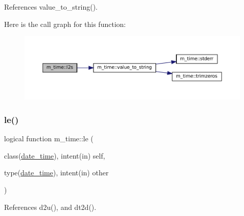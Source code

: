 References value\+\_\+to\+\_\+string().

Here is the call graph for this function\+:\nopagebreak
\begin{figure}[H]
\begin{center}
\leavevmode
\includegraphics[width=350pt]{namespacem__time_a03e90459e69ffa353d1a6ce5765836fd_cgraph}
\end{center}
\end{figure}
\mbox{\label{namespacem__time_a498bb2830d153743d9624e65e92d4f6c}} 
\subsubsection{\texorpdfstring{le()}{le()}}
{\footnotesize\ttfamily logical function m\+\_\+time\+::le (\begin{DoxyParamCaption}\item[{class(\mbox{\hyperlink{structm__time_1_1date__time}{date\+\_\+time}}), intent(in)}]{self,  }\item[{type(\mbox{\hyperlink{structm__time_1_1date__time}{date\+\_\+time}}), intent(in)}]{other }\end{DoxyParamCaption})\hspace{0.3cm}{\ttfamily [private]}}



References d2u(), and dt2d().

